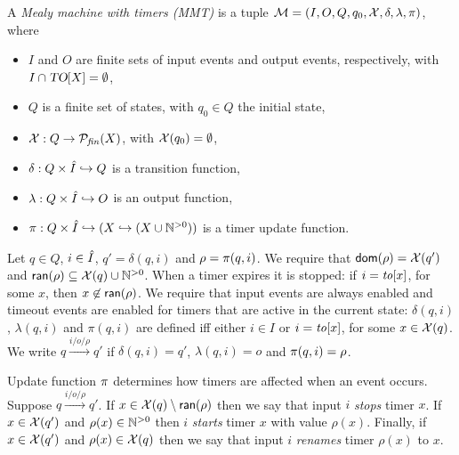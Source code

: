\begin{definition}
\label{def:MMT}
A \emph{Mealy machine with timers (MMT)} is a tuple
${\mathcal M} = (I, O, Q, q_0, \mathcal{X}, \delta, \lambda, \pi)$, where
\begin{itemize}
\item
$I$ and $O$ are finite sets of input events and output events, respectively, with $I \cap \mbox{\sl TO}[X] = \emptyset$,
\item
$Q$ is a finite set of states,
with
$q_0 \in Q$ the initial state,
\item
$\mathcal{X}: Q \rightarrow {\mathcal{P}}_{\mathit{fin}}(X)$, with $\mathcal{X}(q_0) = \emptyset$,
\item
$\delta: Q \times \hat{I} \hookrightarrow  Q$ is a transition function,
\item
$\lambda: Q \times \hat{I} \hookrightarrow O$ is an output function, 
\item
$\pi : Q \times \hat{I} \hookrightarrow (X \hookrightarrow (X \cup {\mathbb N}^{>0}))$ is a timer update function.
\end{itemize}
Let $q \in Q$, $i \in \hat{I}$, $q'=\delta(q,i)$ and $\rho=\pi(q,i)$. 
We require that ${\textsf{dom}}(\rho) = \mathcal{X}(q')$ and ${\textsf{ran}}(\rho) \subseteq \mathcal{X}(q) \cup {\mathbb N}^{>0}$. 
When a timer expires it is stopped: if $i=\mathit{to}[x]$, for some $x$, then $x \not\in {\textsf{ran}}(\rho)$.
%
We require that input events are always enabled and timeout events are enabled
for timers that are active in the current state:
$\delta(q,i)$, $\lambda(q,i)$ and $\pi(q,i)$ are defined iff either
$i \in I$ or $i=\mathit{to}[x]$, for some $x \in\mathcal{X}(q)$.
We write $q \xrightarrow{i/o/\rho} q'$ if $\delta(q,i) = q'$, $\lambda(q,i)= o$ and $\pi(q,i) = \rho$.
\end{definition}
Update function $\pi$ determines how timers are affected when an event occurs. Suppose $q \xrightarrow{i/o/\rho} q'$.
If $x \in \mathcal{X}(q) \setminus {\textsf{ran}}(\rho)$ then we say that input $i$ \emph{stops} timer $x$.
If $x \in \mathcal{X}(q')$ and $\rho(x) \in {\mathbb N}^{>0}$ then $i$ \emph{starts} timer $x$ with value $\rho(x)$.
Finally, if $x \in \mathcal{X}(q')$ and $\rho(x) \in \mathcal{X}(q)$ then we say that input $i$ \emph{renames} timer $\rho(x)$ to $x$.

